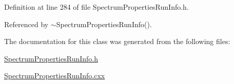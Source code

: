 Definition at line 284 of file SpectrumPropertiesRunInfo.h.

Referenced by $\sim$SpectrumPropertiesRunInfo().

The documentation for this class was generated from the following files:\begin{DoxyCompactItemize}
\item 
\hyperlink{_spectrum_properties_run_info_8h}{SpectrumPropertiesRunInfo.h}\item 
\hyperlink{_spectrum_properties_run_info_8cxx}{SpectrumPropertiesRunInfo.cxx}\end{DoxyCompactItemize}
